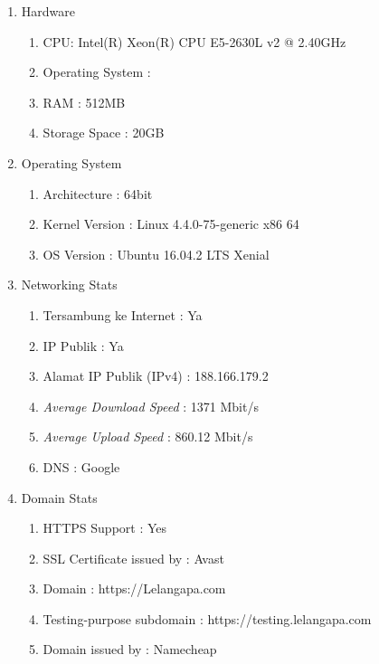   \begin{enumerate}
  	\item Hardware
		  \begin{enumerate}
		  	\item CPU: Intel(R) Xeon(R) CPU E5-2630L v2 @ 2.40GHz
		  	\item Operating System : 
		  	\item RAM : 512MB
		  	\item Storage Space : 20GB
		  \end{enumerate}
		  
   \item Operating System
	   \begin{enumerate}
	   	\item Architecture : 64bit
	   	\item Kernel Version : Linux 4.4.0-75-generic x86 64
	   	\item OS Version : Ubuntu 16.04.2 LTS Xenial
	   	\end{enumerate}
	   	
	\item Networking Stats
		\begin{enumerate}
			\item Tersambung ke Internet : Ya
			\item IP Publik : Ya
			\item Alamat IP Publik (IPv4) : 188.166.179.2
			\item \textit{Average Download Speed} : 1371 Mbit/s
			\item \textit{Average Upload Speed} : 860.12 Mbit/s
			\item DNS : Google
		\end{enumerate}
		
	\item Domain Stats
		\begin{enumerate}
			\item HTTPS Support : Yes
			\item SSL Certificate issued by : Avast
			\item Domain : https://Lelangapa.com
			\item Testing-purpose subdomain : https://testing.lelangapa.com
			\item Domain issued by : Namecheap
		\end{enumerate}
	
  \end{enumerate}
  
